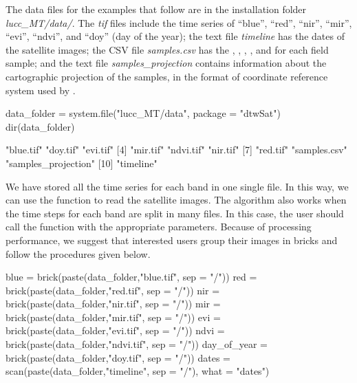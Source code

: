 \documentclass[article,shortnames]{jss}
\begin{document}
The data files for the examples that follow are in the 
installation folder \emph{lucc\_MT/data/}. The \emph{tif} files include
the time series of ``blue'', ``red'', ``nir'', ``mir'', ``evi'',
``ndvi'', and ``doy'' (day of the year); the text file \emph{timeline}
has the dates of the satellite images; the CSV file \emph{samples.csv}
has the , , , , and
 for each field sample; and the text file
\emph{samples\_projection} contains information about the cartographic
projection of the samples, in the format of coordinate reference system
used by .

\begin{CodeChunk}
\begin{CodeInput}
data_folder = system.file("lucc_MT/data", package = "dtwSat")
dir(data_folder)
\end{CodeInput}
\begin{CodeOutput}
 [1] "blue.tif"           "doy.tif"            "evi.tif"           
 [4] "mir.tif"            "ndvi.tif"           "nir.tif"           
 [7] "red.tif"            "samples.csv"        "samples_projection"
[10] "timeline"          
\end{CodeOutput}
\end{CodeChunk}

We have stored all the time series for each band in one single file. In
this way, we can use the function  to read the
satellite images. The algorithm also works when the time steps for each
band are split in many files. In this case, the user should call the
function  with the appropriate parameters. Because
of processing performance, we suggest that interested users group their
images in bricks and follow the procedures given below.

\begin{CodeChunk}
\begin{CodeInput}
blue = brick(paste(data_folder,"blue.tif", sep = "/"))
red  = brick(paste(data_folder,"red.tif", sep = "/"))
nir  = brick(paste(data_folder,"nir.tif", sep = "/"))
mir  = brick(paste(data_folder,"mir.tif", sep = "/"))
evi  = brick(paste(data_folder,"evi.tif", sep = "/"))
ndvi = brick(paste(data_folder,"ndvi.tif", sep = "/"))
day_of_year  = brick(paste(data_folder,"doy.tif", sep = "/"))
dates = scan(paste(data_folder,"timeline", sep = "/"), what = "dates")
\end{CodeInput}
\end{CodeChunk}
\end{document}
